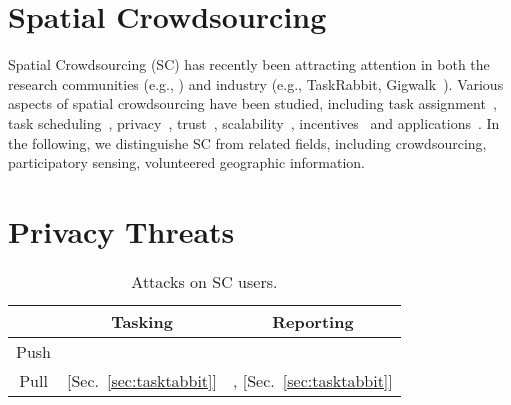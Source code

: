 \documentclass{USC-Thesis}
\numberwithin{equation}{chapter}
\begin{document}
\section{Spatial Crowdsourcing}
Spatial Crowdsourcing (SC) has recently been attracting attention in both the research communities (e.g., \cite{kazemi2012geocrowd,deng2013maximizing,to2014framework,to2016real,to2016sc}) and industry (e.g., TaskRabbit, Gigwalk~\cite{musthag2013labor}).
Various aspects of spatial crowdsourcing have been studied, including task assignment~\cite{kazemi2012geocrowd,dang2013maximum,
pournajaf2014dynamic,Zhang2014,He2014a,Fonteles2014,Hassan2014a,
to2015server,yu2015quality,Xiong2015,
Xiao2015,UlHassan2015,Fonteles2015b,
Guo2016a,Liu2016,Zhang2016c,tong2016online,tong2016vldb,Hu2016,
Cheng2016,asghari12auction,Gao2016,Zhang2016SpatialRecruiter,
ul2016efficient,Bessai2016,
Tan2016,Liu2016b,ul2016efficient,to2016real,
song2017trichromatic,zhao2017destination},
task scheduling~\cite{deng2013maximizing,Sadilek2013,Chen2014TRACCS,
deng2015task,Li2015,Hadano2015,Chen2015Towards,Fonteles2015a,Fonteles2015a,
Mrazovic2016,SalesFonteles2016,Wang2016Towards,Sun2016,Deng2016},
privacy~\cite{to2014framework,pournajaf2014spatial,
Gong2015,zhang2015differentially,Hu2015,
to2016sc,Shen2016,Zhu2016,ni2016secure,
sun2017anonymity,liu2017protecting,liu2017privacy,liu2017efficient}, trust~\cite{kazemi2013geotrucrowd,cheng2015reliable,
Feng2014,Boutsis2014,Song2014,
Wang2015,Zhao2015,Kang2015,An2015,Fan2015Online,
Zhang2016Reliable,Liu2016a},
scalability~\cite{alfarrarjeh2015scalable},
incentives~\cite{Lee2010,Alt2010,Yang2012,Jaimes2012,Heimerl2012,Musthag2012,
musthag2013labor,teodoro2014motivations,Rula2014,
thebault2015avoiding,Shah-Mansouri2015,Jin2015,
Fan2016Truthful,Jaiman2016,Guo2016,to2016empirical,Li2016,
Micholia2016,Miao2016,Kandappu2016a,Kandappu2016,Zhang2016Towards} and applications~\cite{chen2014gmission,kim2014mediaq,to2015effectively,to2016scawg}.
In the following, we distinguishe SC from related fields, including crowdsourcing, participatory sensing, volunteered geographic information.

\section{Privacy Threats}

\begin{wraptable}{r}{0.45\textwidth}
\caption{Attacks on SC users.}
\begin{center}
\begin{tabular}{ | c | c | c | } 
\hline
					& Tasking 				& Reporting \\
\hline
Push 	& \cite{kazemi2011privacy} 	& \cite{Shin2011}  \\  
\hline
Pull 	&  	[Sec.~\ref{sec:tasktabbit}]						& \cite{Wang2016,Shin2011}, [Sec.~\ref{sec:tasktabbit}] \\ 
\hline
\end{tabular}
\label{tab:threats}
\end{center}
\end{wraptable}
\end{document}
